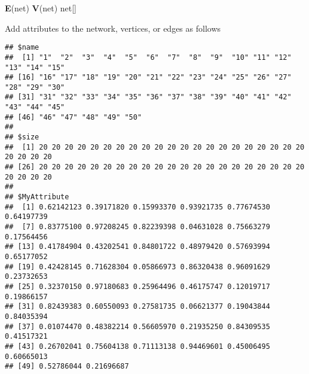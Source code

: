 \documentclass[]{article}
\newenvironment{Shaded}{\begin{snugshade}}{\end{snugshade}}
\newcommand{\CommentTok}[1]{\textcolor[rgb]{0.56,0.35,0.01}{\textit{#1}}}
\newcommand{\DataTypeTok}[1]{\textcolor[rgb]{0.13,0.29,0.53}{#1}}
\newcommand{\DecValTok}[1]{\textcolor[rgb]{0.00,0.00,0.81}{#1}}
\newcommand{\FloatTok}[1]{\textcolor[rgb]{0.00,0.00,0.81}{#1}}
\newcommand{\KeywordTok}[1]{\textcolor[rgb]{0.13,0.29,0.53}{\textbf{#1}}}
\newcommand{\NormalTok}[1]{#1}
\newcommand{\OperatorTok}[1]{\textcolor[rgb]{0.81,0.36,0.00}{\textbf{#1}}}
\newcommand{\StringTok}[1]{\textcolor[rgb]{0.31,0.60,0.02}{#1}}
\begin{document}
\begin{Shaded}
\begin{Highlighting}[]
\KeywordTok{E}\NormalTok{(net)}
\KeywordTok{V}\NormalTok{(net)}
\NormalTok{net[]}
\end{Highlighting}
\end{Shaded}

Add attributes to the network, vertices, or edges as follows

\begin{Shaded}
\end{Shaded}

\begin{verbatim}
## $name
##  [1] "1"  "2"  "3"  "4"  "5"  "6"  "7"  "8"  "9"  "10" "11" "12" "13" "14" "15"
## [16] "16" "17" "18" "19" "20" "21" "22" "23" "24" "25" "26" "27" "28" "29" "30"
## [31] "31" "32" "33" "34" "35" "36" "37" "38" "39" "40" "41" "42" "43" "44" "45"
## [46] "46" "47" "48" "49" "50"
## 
## $size
##  [1] 20 20 20 20 20 20 20 20 20 20 20 20 20 20 20 20 20 20 20 20 20 20 20 20 20
## [26] 20 20 20 20 20 20 20 20 20 20 20 20 20 20 20 20 20 20 20 20 20 20 20 20 20
## 
## $MyAttribute
##  [1] 0.62142123 0.39171820 0.15993370 0.93921735 0.77674530 0.64197739
##  [7] 0.83775100 0.97208245 0.82239398 0.04631028 0.75663279 0.17564456
## [13] 0.41784904 0.43202541 0.84801722 0.48979420 0.57693994 0.65177052
## [19] 0.42428145 0.71628304 0.05866973 0.86320438 0.96091629 0.23732653
## [25] 0.32370150 0.97180683 0.25964496 0.46175747 0.12019717 0.19866157
## [31] 0.82439383 0.60550093 0.27581735 0.06621377 0.19043844 0.84035394
## [37] 0.01074470 0.48382214 0.56605970 0.21935250 0.84309535 0.41517321
## [43] 0.26702041 0.75604138 0.71113138 0.94469601 0.45006495 0.60665013
## [49] 0.52786044 0.21696687
\end{verbatim}

\begin{Shaded}
\end{Shaded}
\end{document}
